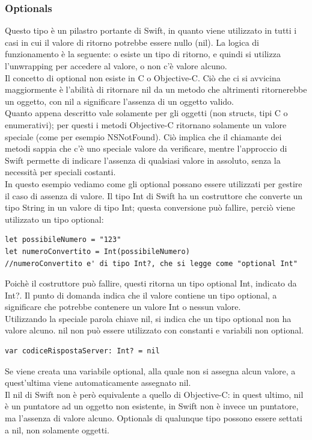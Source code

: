 \subsubsection{Optionals}
Questo tipo è un pilastro portante di Swift, in quanto viene utilizzato in tutti i casi in cui il valore di ritorno potrebbe essere nullo (nil). La logica di funzionamento è la seguente: o esiste un tipo di ritorno, e quindi si utilizza l'unwrapping per accedere al valore, o non c'è valore alcuno.\\
Il concetto di optional non esiste in C o Objective-C. Ciò che ci si avvicina maggiormente è l'abilità di ritornare nil da un metodo che altrimenti ritornerebbe un oggetto, con nil a significare l'assenza di un oggetto valido.\\Quanto appena descritto vale solamente per gli oggetti (non structs, tipi C  o enumerativi); per questi i metodi Objective-C ritornano solamente un valore speciale (come per esempio NSNotFound). Ciò implica che il chiamante dei metodi sappia che c'è uno speciale valore da verificare, mentre l'approccio di Swift permette di indicare l'assenza di qualsiasi valore in assoluto, senza la necessità per speciali costanti.\\
In questo esempio vediamo come gli optional possano essere utilizzati per gestire il caso di assenza di valore. Il tipo Int di Swift ha un costruttore che converte un tipo String in un valore di tipo Int; questa conversione può fallire, perciò viene utilizzato un tipo optional:
\lstset{language=[Objective]C, breakindent=40pt, breaklines}
\begin{lstlisting}
let possibileNumero = "123"
let numeroConvertito = Int(possibileNumero)
//numeroConvertito e' di tipo Int?, che si legge come "optional Int"
\end{lstlisting} 
Poichè il costruttore può fallire, questi ritorna un tipo optional Int, indicato da Int?. Il punto di domanda indica che il valore contiene un tipo optional, a significare che potrebbe contenere un valore Int o nessun valore.\\
Utilizzando la speciale parola chiave nil, si indica che un tipo optional non ha valore alcuno. nil non può essere utilizzato con constanti e variabili non optional.
\lstset{language=[Objective]C, breakindent=40pt, breaklines}
\begin{lstlisting}
var codiceRispostaServer: Int? = nil
\end{lstlisting}
Se viene creata una variabile optional, alla quale non si assegna alcun valore, a quest'ultima viene automaticamente assegnato nil.\\Il nil di Swift non è però equivalente a quello di Objective-C: in quest ultimo, nil è un puntatore ad un oggetto non esistente, in Swift non è invece un puntatore, ma l'assenza di valore alcuno. Optionals di qualunque tipo possono essere settati a nil, non solamente oggetti.\\
